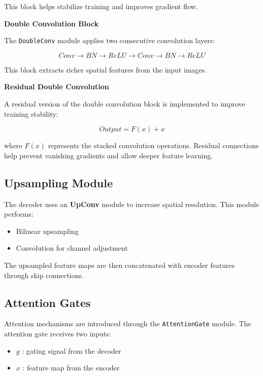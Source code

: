 \documentclass[10pt,twocolumn]{article}
\begin{document}
This block helps stabilize training and improves gradient flow.

\textbf{Double Convolution Block}

The \texttt{DoubleConv} module applies two consecutive convolution layers:

\begin{equation}
Conv \rightarrow BN \rightarrow ReLU \rightarrow Conv \rightarrow BN \rightarrow ReLU
\end{equation}

This block extracts richer spatial features from the input images.

\textbf{Residual Double Convolution}

A residual version of the double convolution block is implemented to improve training stability:

\begin{equation}
Output = F(x) + x
\end{equation}

where $F(x)$ represents the stacked convolution operations.  
Residual connections help prevent vanishing gradients and allow deeper feature learning.

\subsection{Upsampling Module}

The decoder uses an \textbf{UpConv} module to increase spatial resolution.  
This module performs:

\begin{itemize}
\item Bilinear upsampling
\item Convolution for channel adjustment
\end{itemize}

The upsampled feature maps are then concatenated with encoder features through skip connections.

\subsection{Attention Gates}

Attention mechanisms are introduced through the \texttt{AttentionGate} module.  
The attention gate receives two inputs:

\begin{itemize}
\item $g$ : gating signal from the decoder
\item $x$ : feature map from the encoder
\end{itemize}
\end{document}
